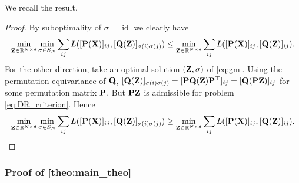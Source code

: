 We recall the result.
\GMproblemequiv*
\begin{proof}
	By suboptimality of $\sigma = \operatorname{id}$ we clearly have 
	\begin{equation}
		\min_{{\mathbf{Z}} \in \mathbb{R}^{N \times d}} \min_{\sigma \in S_N} \sum_{ij} L([{\mathbf{P}}({\mathbf{X}})]_{ij}, [{\mathbf{Q}}({\mathbf{Z}})]_{\sigma(i) \sigma(j)}) \leq \min_{{\mathbf{Z}} \in \mathbb{R}^{N \times d}} \sum_{ij} L([{\mathbf{P}}({\mathbf{X}})]_{ij}, [{\mathbf{Q}}({\mathbf{Z}})]_{i j}).
	\end{equation}
	For the other direction, take an optimal solution $({\mathbf{Z}}, \sigma)$ of \cref{eq:gm}. Using the permutation equivariance of ${\mathbf{Q}}$, $[{\mathbf{Q}}({\mathbf{Z}})]_{\sigma(i) \sigma(j)} = [{\mathbf{P}} {\mathbf{Q}}({\mathbf{Z}}){\mathbf{P}}^\top]_{ij} = [{\mathbf{Q}}({\mathbf{P}} {\mathbf{Z}})]_{ij}$ for some permutation matrix ${\mathbf{P}}$. But ${\mathbf{P}} {\mathbf{Z}}$ is admissible for problem \cref{eq:DR_criterion}. Hence 
	\begin{equation}
		\min_{{\mathbf{Z}} \in \mathbb{R}^{N \times d}} \min_{\sigma \in S_N} \sum_{ij} L([{\mathbf{P}}({\mathbf{X}})]_{ij}, [{\mathbf{Q}}({\mathbf{Z}})]_{\sigma(i) \sigma(j)}) \geq \min_{{\mathbf{Z}} \in \mathbb{R}^{N \times d}} \sum_{ij} L([{\mathbf{P}}({\mathbf{X}})]_{ij}, [{\mathbf{Q}}({\mathbf{Z}})]_{i j}).
	\end{equation}
\end{proof}

\subsubsection{Proof of \cref{theo:main_theo} \label{proof:theo:main_theo}}

